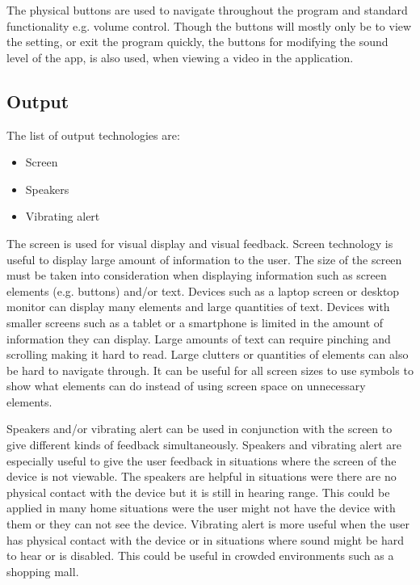 
The physical buttons are used to navigate throughout the program and standard functionality e.g. volume control. Though the buttons will mostly only be to view the setting, or exit the program quickly, the buttons for modifying the sound level of the app, is also used, when viewing a video in the application.

\subsection{Output}
The list of output technologies are:

\begin{itemize}
    \item Screen
    \item Speakers
    \item Vibrating alert
\end{itemize}

The screen is used for visual display and visual feedback. Screen technology is useful to display large amount of information to the user. The size of the screen must be taken into consideration when displaying information such as screen elements (e.g. buttons) and/or text. Devices such as a laptop screen or desktop monitor can display many elements and large quantities of text. Devices with smaller screens such as a tablet or a smartphone is limited in the amount of information they can display. Large amounts of text can require pinching and scrolling making it hard to read. Large clutters or quantities of elements can also be hard to navigate through. It can be useful for all screen sizes to use symbols to show what elements can do instead of using screen space on unnecessary elements.            

Speakers and/or vibrating alert can be used in conjunction with the screen to give different kinds of feedback simultaneously. Speakers and vibrating alert are especially useful to give the user feedback in situations where the screen of the device is not viewable. The speakers are helpful in situations were there are no physical contact with the device but it is still in hearing range. This could be applied in many home situations were the user might not have the device with them or they can not see the device. Vibrating alert is more useful when the user has physical contact with the device or in situations where sound might be hard to hear or is disabled. This could be useful in crowded environments such as a shopping mall.     

